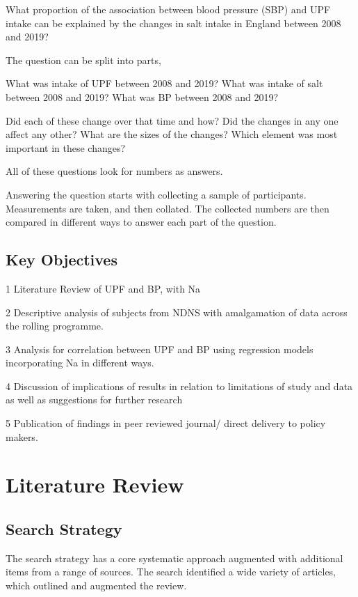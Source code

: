 \documentclass[
]{article}
\begin{document}
What proportion of the association between blood pressure (SBP) and UPF
intake can be explained by the changes in salt intake in England between
2008 and 2019?

The question can be split into parts,

What was intake of UPF between 2008 and 2019? What was intake of salt
between 2008 and 2019? What was BP between 2008 and 2019?

Did each of these change over that time and how? Did the changes in any
one affect any other? What are the sizes of the changes? Which element
was most important in these changes?

All of these questions look for numbers as answers.

Answering the question starts with collecting a sample of participants.
Measurements are taken, and then collated. The collected numbers are
then compared in different ways to answer each part of the question.

\hypertarget{key-objectives}{%
\subsection{Key Objectives}\label{key-objectives}}

1 Literature Review of UPF and BP, with Na

2 Descriptive analysis of subjects from NDNS with amalgamation of data
across the rolling programme.

3 Analysis for correlation between UPF and BP using regression models
incorporating Na in different ways.

4 Discussion of implications of results in relation to limitations of
study and data as well as suggestions for further research

5 Publication of findings in peer reviewed journal/ direct delivery to
policy makers.

\newpage

\hypertarget{literature-review}{%
\section{Literature Review}\label{literature-review}}

\hypertarget{search-strategy}{%
\subsection{Search Strategy}\label{search-strategy}}

The search strategy has a core systematic approach augmented with
additional items from a range of sources. The search identified a wide
variety of articles, which outlined and augmented the review.
\end{document}
